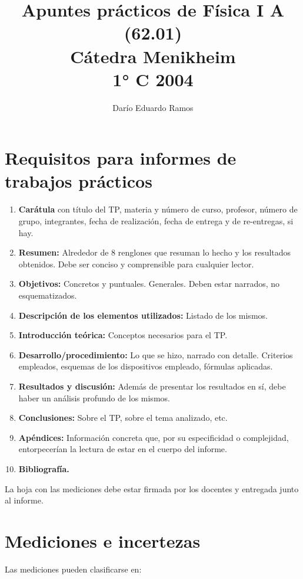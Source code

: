 \documentclass{article}
\title{Apuntes prácticos de Física I A (62.01) \\ Cátedra Menikheim \\ 1° C 2004}
\author{Darío Eduardo Ramos}
\begin{document}
\maketitle
\tableofcontents{}
\newpage

\section{Requisitos para informes de trabajos prácticos}

\begin{enumerate}
\item \textbf{Carátula} con título del TP, materia y número de curso, profesor, número de grupo, integrantes, fecha de realización, fecha de entrega y de re-entregas, si hay.
\item \textbf{Resumen:} Alrededor de 8 renglones que resuman lo hecho y los resultados obtenidos. Debe ser conciso y comprensible para cualquier lector.
\item \textbf{Objetivos:} Concretos y puntuales. Generales. Deben estar narrados, no esquematizados.
\item \textbf{Descripción de los elementos utilizados:} Listado de los mismos.
\item \textbf{Introducción teórica:} Conceptos necesarios para el TP.
\item \textbf{Desarrollo/procedimiento:} Lo que se hizo, narrado con detalle. Criterios empleados, esquemas de los dispositivos empleado, fórmulas aplicadas.
\item \textbf{Resultados y discusión:} Además de presentar los resultados en sí, debe haber un análisis profundo de los mismos.
\item \textbf{Conclusiones:} Sobre el TP, sobre el tema analizado, etc.
\item \textbf{Apéndices:} Información concreta que, por su especificidad o complejidad, entorpecerían la lectura de estar en el cuerpo del informe.
\item \textbf{Bibliografía.}
\end{enumerate}

La hoja con las mediciones debe estar firmada por los docentes y entregada junto al informe.

\section{Mediciones e incertezas}

Las mediciones pueden clasificarse en:
\end{document}
